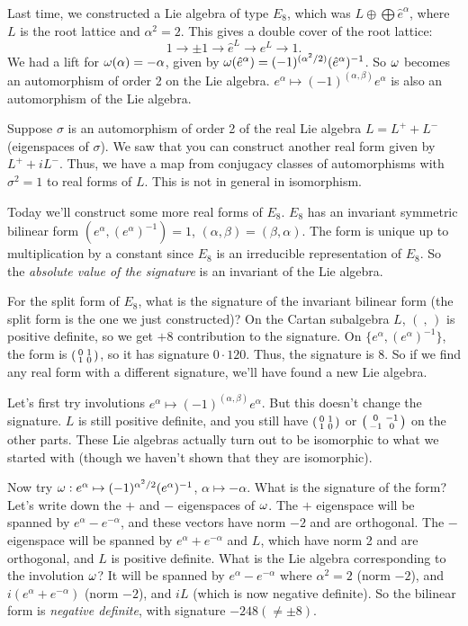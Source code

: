  \setcounter{lecture}{28}

 Last time, we constructed a Lie algebra of type $E_8$, which was $L\oplus \bigoplus
 \hat e^\alpha$, where $L$ is the root lattice and $\alpha^2=2$. This gives a double
 cover of the root lattice:
 \[
    1\to \pm 1\to \hat e^L\to e^L\to 1.
 \]
 We had a lift for $\omega(\alpha)=-\alpha$, given by $\omega(\hat
 e^\alpha)=(-1)^{(\alpha^2/2)}(\hat e^\alpha)^{-1}$. So $\omega$ becomes an automorphism of
 order 2 on the Lie algebra. $e^\alpha\mapsto (-1)^{(\alpha,\beta)} e^\alpha$
 is also an automorphism of the Lie algebra.

 Suppose $\sigma$ is an automorphism of order 2 of the real Lie algebra $L=L^+ +L^-$
 (eigenspaces of $\sigma$). We saw that you can construct another real form given by $L^+
 +iL^-$. Thus, we have a map from conjugacy classes of automorphisms with $\sigma^2=1$
 to real forms of $L$. This is not in general in isomorphism.

 Today we'll construct some more real forms of $E_8$. $E_8$ has an invariant symmetric
 bilinear form $(e^\alpha,(e^\alpha)^{-1})=1$, $(\alpha,\beta)=(\beta,\alpha)$. The
 form is unique up to multiplication by a constant since $E_8$ is an irreducible
 representation of $E_8$. So the \emph{absolute value of the signature} is an
 invariant of the Lie algebra.

 For the split form of $E_8$, what is the signature of the invariant bilinear form
 (the split form is the one we just constructed)? On the Cartan subalgebra $L$, $(\
 ,\,)$ is positive definite, so we get $+8$ contribution to the signature. On
 $\{e^\alpha,(e^\alpha)^{-1}\}$, the form is $\left( \begin{smallmatrix} 0 & 1 \\ 1 & 0 \end{smallmatrix} \right)$, so it has signature
 $0\cdot 120$. Thus, the signature is 8. So if we find any real form with a different
 signature, we'll have found a new Lie algebra.

 Let's first try involutions $e^\alpha\mapsto (-1)^{(\alpha,\beta)}e^\alpha$. But this
 doesn't change the signature. $L$ is still positive definite, and you still have
 $\left( \begin{smallmatrix} 0 & 1 \\ 1 & 0 \end{smallmatrix} \right)$ or $\left( \begin{smallmatrix} 0 & -1 \\ -1 & 0 \end{smallmatrix} \right)$ on the other parts. These Lie algebras
 actually turn out to be isomorphic to what we started with (though we haven't shown
 that they are isomorphic).

 Now try $\omega:e^\alpha\mapsto (-1)^{\alpha^2/2}(e^\alpha)^{-1}$, $\alpha\mapsto
 -\alpha$. What is the signature of the form? Let's write down the $+$ and $-$
 eigenspaces of $\omega$. The $+$ eigenspace will be spanned by $e^\alpha - e^{-\alpha}$,
 and these vectors have norm $-2$ and are orthogonal. The $-$ eigenspace will be
 spanned by $e^\alpha + e^{-\alpha}$ and $L$, which have norm 2 and are orthogonal,
 and $L$ is positive definite. What is the Lie algebra corresponding to the involution
 $\omega$? It will be spanned by $e^\alpha - e^{-\alpha}$ where $\alpha^2=2$ (norm $-2$), and
 $i(e^\alpha + e^{-\alpha})$ (norm $-2$), and $iL$ (which is now negative definite).
 So the bilinear form is \emph{negative definite}, with signature $-248 (\neq \pm 8)$.


